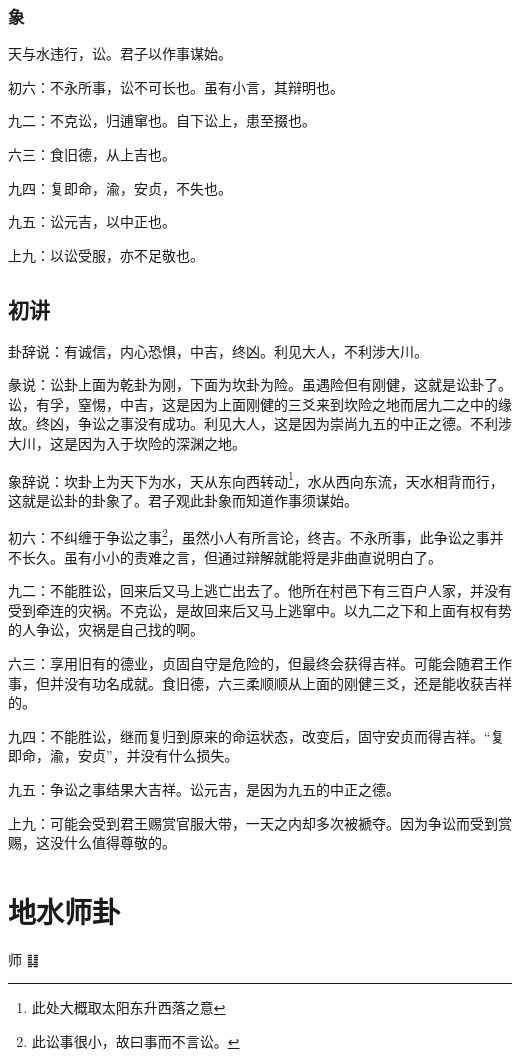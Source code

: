 \documentclass[12pt,oneside]{book}
\begin{document}
\subsection{象}
天与水违行，讼。君子以作事谋始。

初六：不永所事，讼不可长也。虽有小言，其辩明也。

九二：不克讼，归逋窜也。自下讼上，患至掇也。

六三：食旧德，从上吉也。

九四：复即命，渝，安贞，不失也。

九五：讼元吉，以中正也。

上九：以讼受服，亦不足敬也。


\section{初讲}
卦辞说：有诚信，内心恐惧，中吉，终凶。利见大人，不利涉大川。

彖说：讼卦上面为乾卦为刚，下面为坎卦为险。虽遇险但有刚健，这就是讼卦了。讼，有孚，窒惕，中吉，这是因为上面刚健的三爻来到坎险之地而居九二之中的缘故。终凶，争讼之事没有成功。利见大人，这是因为崇尚九五的中正之德。不利涉大川，这是因为入于坎险的深渊之地。

象辞说：坎卦上为天下为水，天从东向西转动\footnote{此处大概取太阳东升西落之意}，水从西向东流，天水相背而行，这就是讼卦的卦象了。君子观此卦象而知道作事须谋始。

初六：不纠缠于争讼之事\footnote{此讼事很小，故曰事而不言讼。}，虽然小人有所言论，终吉。不永所事，此争讼之事并不长久。虽有小小的责难之言，但通过辩解就能将是非曲直说明白了。

九二：不能胜讼，回来后又马上逃亡出去了。他所在村邑下有三百户人家，并没有受到牵连的灾祸。不克讼，是故回来后又马上逃窜中。以九二之下和上面有权有势的人争讼，灾祸是自己找的啊。

六三：享用旧有的德业，贞固自守是危险的，但最终会获得吉祥。可能会随君王作事，但并没有功名成就。食旧德，六三柔顺顺从上面的刚健三爻，还是能收获吉祥的。

九四：不能胜讼，继而复归到原来的命运状态，改变后，固守安贞而得吉祥。“复即命，渝，安贞”，并没有什么损失。

九五：争讼之事结果大吉祥。讼元吉，是因为九五的中正之德。

上九：可能会受到君王赐赏官服大带，一天之内却多次被褫夺。因为争讼而受到赏赐，这没什么值得尊敬的。



\chapter{地水师卦}
师 {\Large ䷆}
\end{document}
